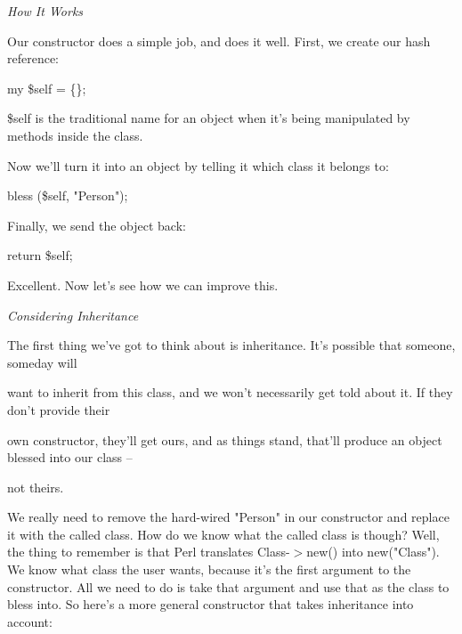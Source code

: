 \documentclass[a4paper,11pt]{book}
\begin{document}
\noindent 

\noindent \textit{How It Works}

\noindent Our constructor does a simple job, and does it well. First, we create our hash reference:

\noindent 

\noindent my \$self = \{\};

\noindent 

\noindent 

\noindent \$self is the traditional name for an object when it's being manipulated by methods inside the class.

\noindent Now we'll turn it into an object by telling it which class it belongs to:

\noindent 

\noindent bless (\$self, "Person");

\noindent 

\noindent Finally, we send the object back:

\noindent 

\noindent return \$self;

\noindent 

\noindent Excellent. Now let's see how we can improve this.

\noindent 

\noindent \textit{Considering Inheritance}

\noindent The first thing we've  got to  think  about  is  inheritance.  It's  possible  that  someone,  someday  will

\noindent want to  inherit from this  class,  and  we  won't  necessarily  get  told  about  it.  If  they  don't  provide  their

\noindent own  constructor,  they'll  get ours,  and  as  things  stand,  that'll  produce  an  object  blessed  into  our  class --

\noindent not theirs.

\noindent 

\noindent We really need to remove the hard-wired "Person" in our constructor and replace it with the called class. How do we know what the called class is though? Well, the thing to remember is that Perl translates Class-$>$new() into new("Class"). We know what class the user wants, because it's the first argument to the constructor. All we need to do is take that argument and use that as the class to bless into. So here's a more general constructor that takes inheritance into account:

\noindent 
\end{document}
